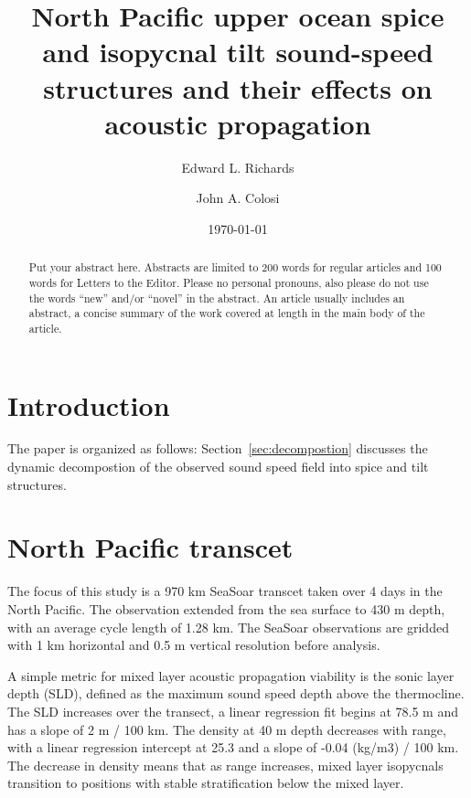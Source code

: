 \documentclass[preprint]{JASA}
\begin{document}
\title[Mixed layer tilt and spice]{North Pacific upper ocean spice and isopycnal tilt sound-speed structures and their effects on acoustic propagation}
\author{Edward L. Richards}
\author{John A. Colosi}


\date{\today}


\begin{abstract}
Put your abstract here. Abstracts are limited to 200 words for
regular articles and 100 words for Letters to the Editor. Please no
personal pronouns, also please do not use the words ``new'' and/or
``novel'' in the abstract. An article usually includes an abstract, a
concise summary of the work covered at length in the main body of the
article.
\end{abstract}

\maketitle

\section{\label{sec:intro} Introduction}

The paper is organized as follows: Section~\ref{sec:decompostion} discusses the dynamic decompostion of the observed sound speed field into spice and tilt structures.

\section{North Pacific transcet}
The focus of this study is a 970 km SeaSoar transcet taken over 4 days in the North Pacific. The observation extended from the sea surface to 430 m depth, with an average cycle length of 1.28 km. The SeaSoar observations are gridded with 1 km horizontal and 0.5 m vertical resolution before analysis.

A simple metric for mixed layer acoustic propagation viability is the sonic layer depth (SLD), defined as the maximum sound speed depth above the thermocline. The SLD increases over the transect, a linear regression fit begins at 78.5 m and has a slope of 2 m / 100 km. The density at 40 m depth decreases with range, with a linear regression intercept at 25.3 and a slope of -0.04 (kg/m3) / 100 km. The decrease in density means that as range increases, mixed layer isopycnals transition to positions with stable stratification below the mixed layer.
\end{document}
